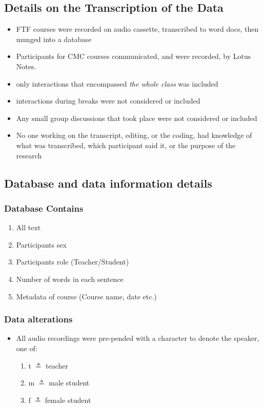 \documentclass[10pt, letterpaper]{article}
\begin{document}
\subsection*{Details on the Transcription of the Data}
\label{sec:org5120c10}
\begin{itemize}
\item FTF courses were recorded on audio cassette, transcribed to word docs, then
munged into a database
\item Participants for CMC courses communicated, and were recorded, by Lotus Notes.
\item only interactions that encompassed \emph{the whole class} was included
\item interactions during breaks were not considered or included
\item Any small group discussions that took place were not considered or included
\item No one working on the transcript, editing, or the coding, had knowledge of
what was transcribed, which participant said it, or the purpose of the
research
\end{itemize}

\subsection*{Database and data information details}
\label{sec:orgc00e5d8}
\subsubsection*{Database Contains}
\label{sec:org398b9b1}
\begin{enumerate}
\item All text
\item Participants sex
\item Participants role (Teacher/Student)
\item Number of words in each sentence
\item Metadata of course (Course name, date etc.)
\end{enumerate}
\subsubsection*{Data alterations}
\label{sec:org6a8fbdd}
\begin{itemize}
\item All audio recordings were pre-pended with a character to denote the speaker, one of:
\begin{enumerate}
\item t \(\triangleq\) teacher
\item m \(\triangleq\) male student
\item f \(\triangleq\) female student
\end{enumerate}
\end{itemize}
\end{document}
